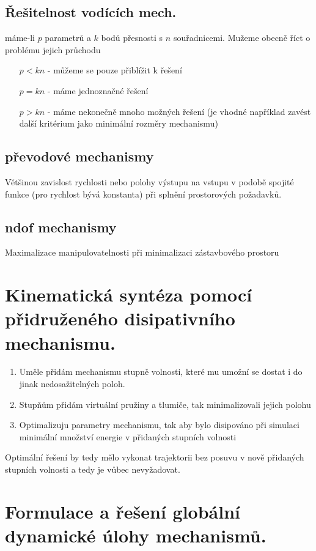 \documentclass{article}
\begin{document}
	\subsection*{Řešitelnost vodících mech.}
	máme-li $p$ parametrů a $k$ bodů přesnosti s $n$ souřadnicemi. Mužeme obecně říct o problému jejich průchodu
	\begin{itemize}
		\item [$p<kn$] - můžeme se pouze přiblížit k řešení
		\item [$p=kn$] - máme jednoznačné řešení
		\item [$p>kn$] - máme nekonečně mnoho možných řešení (je vhodné například zavést další kritérium jako minimální rozměry mechanismu)
	\end{itemize}

	\subsection*{převodové mechanismy}
	Většinou zavislost rychlosti nebo polohy výstupu na vstupu v podobě spojité funkce (pro rychlost bývá konstanta) při splnění prostorových požadavků.

	\subsection*{ndof mechanismy}
	Maximalizace manipulovatelnosti při minimalizaci zástavbového prostoru

	\section{Kinematická syntéza pomocí přidruženého disipativního mechanismu.}
	\begin{enumerate}
		\item Uměle přidám mechanismu stupně volnosti, které mu umožní se dostat i do jinak nedosažitelných poloh.
		\item Stupňům přidám virtuální pružiny a tlumiče, tak minimalizovali jejich polohu
		\item Optimalizuju parametry mechanismu, tak aby bylo disipováno při simulaci minimální množství energie v přidaných stupních volnosti
	\end{enumerate}

	Optimální řešení by tedy mělo vykonat trajektorii bez posuvu v nově přidaných stupních volnosti a tedy je vůbec nevyžadovat.

	\section{Formulace a řešení globální dynamické úlohy mechanismů. }
\end{document}
